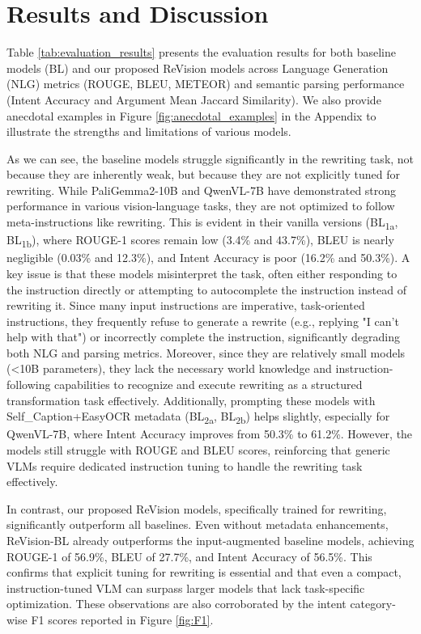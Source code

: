 \section{Results and Discussion}
\label{sec:results}

Table \ref{tab:evaluation_results} presents the evaluation results for both baseline models (BL) and our proposed ReVision models across Language Generation (NLG) metrics (ROUGE, BLEU, METEOR) and semantic parsing performance (Intent Accuracy and Argument Mean Jaccard Similarity). We also provide anecdotal examples in Figure \ref{fig:anecdotal_examples} in the Appendix to illustrate the strengths and limitations of various models.

As we can see, the baseline models struggle significantly in the rewriting task, not because they are inherently weak, but because they are not explicitly tuned for rewriting. While PaliGemma2-10B and QwenVL-7B have demonstrated strong performance in various vision-language tasks, they are not optimized to follow meta-instructions like rewriting. This is evident in their vanilla versions (BL\textsubscript{1a}, BL\textsubscript{1b}), where ROUGE-1 scores remain low (3.4\% and 43.7\%), BLEU is nearly negligible (0.03\% and 12.3\%), and Intent Accuracy is poor (16.2\% and 50.3\%). A key issue is that these models misinterpret the task, often either responding to the instruction directly or attempting to autocomplete the instruction instead of rewriting it. Since many input instructions are imperative, task-oriented instructions, they frequently refuse to generate a rewrite (e.g., replying "I can't help with that") or incorrectly complete the instruction, significantly degrading both NLG and parsing metrics. Moreover, since they are relatively small models (<10B parameters), they lack the necessary world knowledge and instruction-following capabilities to recognize and execute rewriting as a structured transformation task effectively. Additionally, prompting these models with Self\_Caption+EasyOCR metadata (BL\textsubscript{2a}, BL\textsubscript{2b}) helps slightly, especially for QwenVL-7B, where Intent Accuracy improves from 50.3\% to 61.2\%. However, the models still struggle with ROUGE and BLEU scores, reinforcing that generic VLMs require dedicated instruction tuning to handle the rewriting task effectively.

In contrast, our proposed ReVision models, specifically trained for rewriting, significantly outperform all baselines. Even without metadata enhancements, ReVision-BL already outperforms the input-augmented baseline models, achieving ROUGE-1 of 56.9\%, BLEU of 27.7\%, and Intent Accuracy of 56.5\%. This confirms that explicit tuning for rewriting is essential and that even a compact, instruction-tuned VLM can surpass larger models that lack task-specific optimization. These observations are also corroborated by the intent category-wise F1 scores reported in Figure \ref{fig:F1}. 

